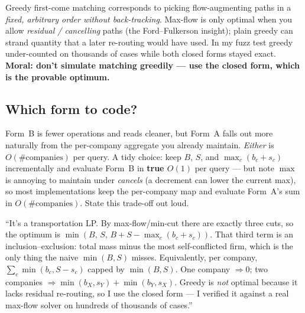 Greedy first-come matching corresponds to picking flow-augmenting paths in a
\emph{fixed, arbitrary order without back-tracking}. Max-flow is only optimal when
you allow \emph{residual / cancelling} paths (the Ford--Fulkerson insight); plain
greedy can strand quantity that a later re-routing would have used. In my fuzz
test greedy under-counted on thousands of cases while both closed forms stayed
exact. \textbf{Moral: don't simulate matching greedily --- use the closed form,
which is the provable optimum.}

\subsection{Which form to code?}

Form~B is fewer operations and reads cleaner, but Form~A falls out more naturally
from the per-company aggregate you already maintain. \emph{Either} is $O(\#\text{companies})$
per query. A tidy choice: keep $B$, $S$, and $\max_c(b_c+s_c)$ incrementally and
evaluate Form~B in \textbf{true $O(1)$} per query --- but note $\max$ is annoying
to maintain under \emph{cancels} (a decrement can lower the current max), so most
implementations keep the per-company map and evaluate Form~A's sum in
$O(\#\text{companies})$. State this trade-off out loud.

\begin{say}
``It's a transportation LP. By max-flow/min-cut there are exactly three cuts, so
the optimum is $\min(B,\,S,\,B+S-\max_c(b_c+s_c))$. That third term is an
inclusion--exclusion: total mass minus the most self-conflicted firm, which is the
only thing the naive $\min(B,S)$ misses. Equivalently, per company,
$\sum_c\min(b_c,S-s_c)$ capped by $\min(B,S)$. One company $\Rightarrow 0$; two
companies $\Rightarrow \min(b_X,s_Y)+\min(b_Y,s_X)$. Greedy is \emph{not} optimal
because it lacks residual re-routing, so I use the closed form --- I verified it
against a real max-flow solver on hundreds of thousands of cases.''
\end{say}

